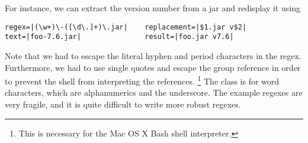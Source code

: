 For instance, we can extract the version number from a jar and
redisplay it using
%

\begin{verbatim}
regex=|(\w+)\-([\d\.]+)\.jar|    replacement=|$1.jar v$2|
text=|foo-7.6.jar|               result=|foo.jar v7.6|
\end{verbatim}
%
Note that we had to escape the literal hyphen and period characters in
the regex.  Furthermore, we had to use single quotes and escape the group
reference  in order to prevent the shell from interpreting
the references.%
\footnote{This is necessary for the Mac OS X Bash shell interpreter.}
%
The class  is for word characters, which are
alphanumerics and the underscore.  The example regexes are very
fragile, and it is quite difficult to write more robust regexes.













